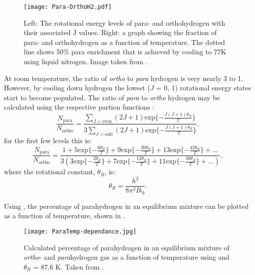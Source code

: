  \begin{figure*}
   \begin{center}
   \texttt{[image: Para-OrthoH2.pdf]}
   \end{center}
   \caption{Left: The rotational energy levels of para- and orthohydrogen with their associated J values. Right: a graph
   showing the fraction of para- and orthohydrogen as a function of temperature. The dotted line shows 50\% para
   enrichment that is achieved by cooling to 77K using liquid nitrogen. Image taken from \citep{barskiy2017nmr}.}
   \label{fig:POH2}
 \end{figure*}


 At room temperature, the ratio of \textit{ortho} to \textit{para} hydrogen is very nearly 3 to 1. However, by cooling down hydrogen
 the lowest ($J$ = 0, 1) rotational energy states start to become populated. The ratio of \textit{para} to \textit{ortho} hydrogen may be
 calculated using the respective partion functions \citep{GREEN20121}:
\begin{equation}
  \frac{N_{\text{para}}}{N_{\text{ortho}}} = \frac{\sum_{J = \text{even}}(2J+1)\text{exp}\{-\frac{J(J+1)\theta_R}{T}\}}{3\sum_{J = \text{odd}}(2J+1)\text{exp}\{-\frac{J(J+1)\theta_R}{T}\}},
\end{equation}
for the first few levels this is:
\begin{equation}\label{eqn:partition}
  \frac{N_{\text{para}}}{N_{\text{ortho}}} = \frac{1 + 5\text{exp}\{-\frac{6\theta_R}{T}\} + 9\text{exp}\{-\frac{20\theta_R}{T}\} + 13\text{exp}\{-\frac{42\theta_R}{T}\} + \dots}{3(3\text{exp}\{-\frac{2\theta_R}{T}\} + 7\text{exp}\{-\frac{12\theta_R}{T}\} + 11\text{exp}\{-\frac{30\theta_R}{T}\} + \dots)},
\end{equation}
 where the rotational constant, $\theta_R$, is:
 \begin{equation}
   \theta_R = \frac{h^2}{8\pi^2Ik_b}.
 \end{equation}

Using , the percentage of parahydrogen in an equilibrium mixture can be plotted as a function of temperature, shown in .

\begin{figure}[ht]
  \begin{center}
  \texttt{[image: ParaTemp-dependance.jpg]}
  \end{center}
  \caption{Calculated percentage of parahydrogen in an equilibrium mixture of \textit{ortho}- and \textit{para}hydrogen gas
  as a function of temperature using  and $\theta_R$ = 87.6 K. Taken from \citep{GREEN20121}.}
  \label{fig:ParaTemp}
\end{figure}

